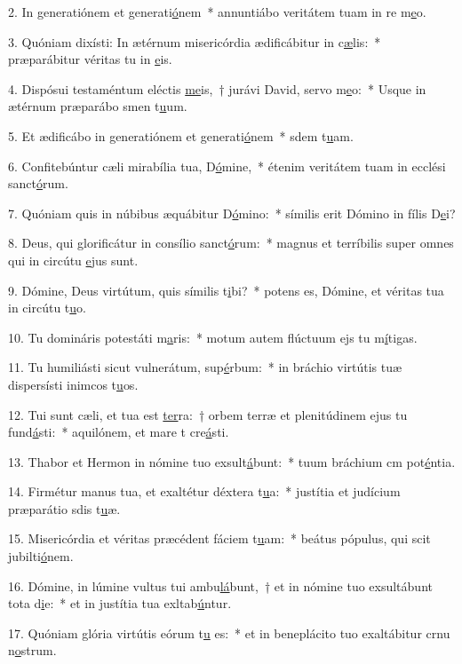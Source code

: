 2. In generatiónem et generati\uline{ó}nem~* annuntiábo veritátem tuam in re m\uline{e}o.\par 
3. Quóniam dixísti: In ætérnum misericórdia ædificábitur in c\uline{æ}lis:~* præparábitur véritas tu in \uline{e}is.\par 
4. Dispósui testaméntum eléctis \uline{me}is,~† jurávi David, servo m\uline{e}o:~* Usque in ætérnum præparábo smen t\uline{u}um.\par 
5. Et ædificábo in generatiónem et generati\uline{ó}nem~* sdem t\uline{u}am.\par 
6. Confitebúntur cæli mirabília tua, D\uline{ó}mine,~* étenim veritátem tuam in ecclési sanct\uline{ó}rum.\par 
7. Quóniam quis in núbibus æquábitur D\uline{ó}mino:~* símilis erit Dómino in fílis D\uline{e}i?\par 
8. Deus, qui glorificátur in consílio sanct\uline{ó}rum:~* magnus et terríbilis super omnes qui in circútu \uline{e}jus sunt.\par 
9. Dómine, Deus virtútum, quis símilis t\uline{i}bi?~* potens es, Dómine, et véritas tua in circútu t\uline{u}o.\par 
10. Tu domináris potestáti m\uline{a}ris:~* motum autem flúctuum ejs tu m\uline{í}tigas.\par 
11. Tu humiliásti sicut vulnerátum, sup\uline{é}rbum:~* in bráchio virtútis tuæ dispersísti inimcos t\uline{u}os.\par 
12. Tui sunt cæli, et tua est \uline{ter}ra:~† orbem terræ et plenitúdinem ejus tu fund\uline{á}sti:~* aquilónem, et mare t cre\uline{á}sti.\par 
13. Thabor et Hermon in nómine tuo exsult\uline{á}bunt:~* tuum bráchium cm pot\uline{é}ntia.\par 
14. Firmétur manus tua, et exaltétur déxtera t\uline{u}a:~* justítia et judícium præparátio sdis t\uline{u}æ.\par 
15. Misericórdia et véritas præcédent fáciem t\uline{u}am:~* beátus pópulus, qui scit jubilti\uline{ó}nem.\par 
16. Dómine, in lúmine vultus tui ambu\uline{lá}bunt,~† et in nómine tuo exsultábunt tota d\uline{i}e:~* et in justítia tua exltab\uline{ú}ntur.\par 
17. Quóniam glória virtútis eórum t\uline{u} es:~* et in beneplácito tuo exaltábitur crnu n\uline{o}strum.\par 
